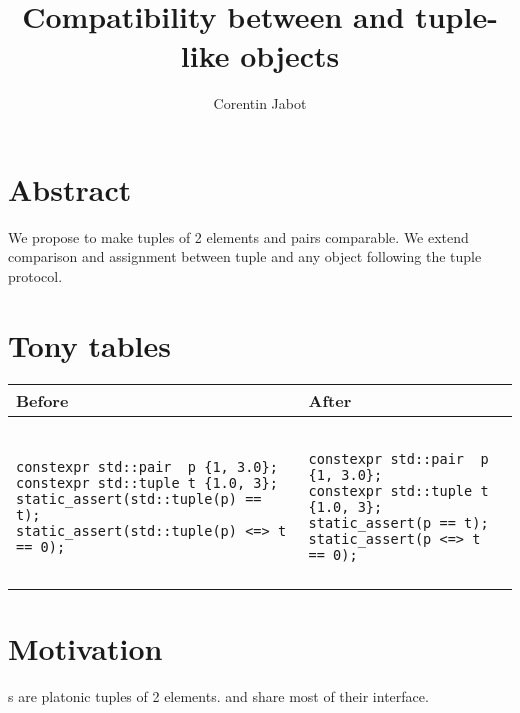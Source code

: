\documentclass{wg21}
\title{Compatibility between \tcode{tuple} and tuple-like objects}
\author{Corentin Jabot}{corentin.jabot@gmail.com}
\begin{document}
\maketitle


\section{Abstract}

We propose to make tuples of 2 elements and pairs comparable.
We extend comparison and assignment between tuple and any object following the tuple protocol.

\section{Tony tables}
\begin{center}
\begin{tabular}{l|l}
Before & After\\ \hline

\begin{minipage}[t]{0.5\textwidth}
\begin{lstlisting}[style=color]

constexpr std::pair  p {1, 3.0};
constexpr std::tuple t {1.0, 3};
static_assert(std::tuple(p) == t);
static_assert(std::tuple(p) <=> t == 0);

\end{lstlisting}
\end{minipage}
&
\begin{minipage}[t]{0.5\textwidth}
\begin{lstlisting}[style=color]

constexpr std::pair  p {1, 3.0};
constexpr std::tuple t {1.0, 3};
static_assert(p == t);
static_assert(p <=> t == 0);

\end{lstlisting}
\end{minipage}
\\\\ \hline

\end{tabular}
\end{center}

\section{Motivation}

s are platonic tuples of 2 elements.  and  share
most of their interface.
\end{document}

